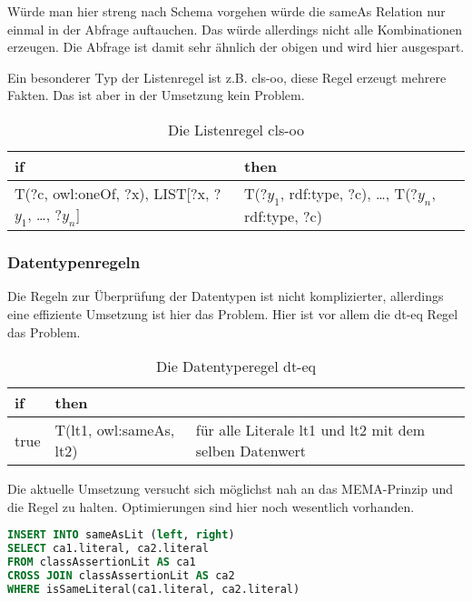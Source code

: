 Würde man hier streng nach Schema vorgehen würde die sameAs Relation nur einmal in der Abfrage auftauchen. Das würde allerdings nicht alle Kombinationen erzeugen. Die Abfrage ist damit sehr ähnlich der obigen und wird hier ausgespart.

Ein besonderer Typ der Listenregel ist z.B. cls-oo, diese Regel erzeugt mehrere Fakten. Das ist aber in der Umsetzung kein Problem.
\begin{table}[htb]
\begin{center}
	\begin{tabular}{m{4.5cm}|m{4cm}}
	if & then \\ \hline
 	T(?c, owl:oneOf, ?x),\newline
 	LIST[?x, ?$y_1$, \ldots, ?$y_n$]
								 	&
								 	T(?$y_1$, rdf:type, ?c),\newline
								 	\ldots,\newline
								 	T(?$y_n$, rdf:type, ?c)
	\end{tabular}
\end{center}
	\caption{Die Listenregel cls-oo}
	\label{rule-cls-oo}
\end{table}


\subsubsection{Datentypenregeln}
Die Regeln zur Überprüfung der Datentypen ist nicht komplizierter, allerdings eine effiziente Umsetzung ist hier das Problem. Hier ist vor allem die dt-eq Regel das Problem.
\begin{table}[htb]
\begin{center}
	\begin{tabular}{l|l|M{3cm}}
	if & then & \\ \hline
	true & T(lt1, owl:sameAs, lt2) & für alle Literale lt1 und lt2 mit dem selben Datenwert
	\end{tabular}
\end{center}
	\caption{Die Datentyperegel dt-eq}
	\label{rule-dt-eq}
\end{table}


Die aktuelle Umsetzung versucht sich möglichst nah an das MEMA-Prinzip und die Regel zu halten. Optimierungen sind hier noch wesentlich vorhanden.

\begin{lstlisting}[language=SQL]
INSERT INTO sameAsLit (left, right)
SELECT ca1.literal, ca2.literal
FROM classAssertionLit AS ca1
CROSS JOIN classAssertionLit AS ca2
WHERE isSameLiteral(ca1.literal, ca2.literal)
\end{lstlisting}

